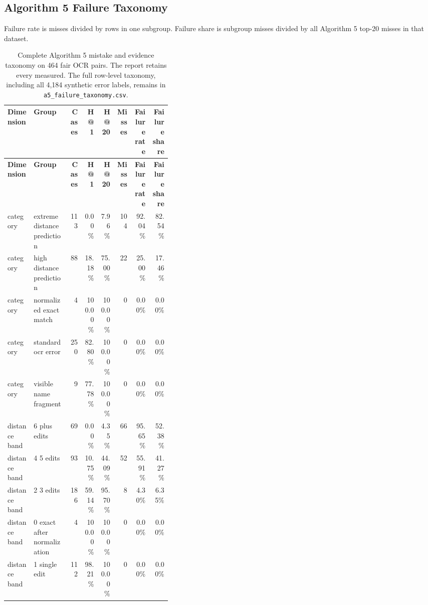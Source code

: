 \subsection{Algorithm 5 Failure Taxonomy}
Failure rate is misses divided by rows in one subgroup. Failure share is subgroup misses divided by all Algorithm 5 top-20 misses in that dataset.

\begin{landscape}
\begin{tiny}
\setlength{\tabcolsep}{0.8pt}
\renewcommand{\arraystretch}{1.05}
\begin{longtable}{@{}L{0.16\linewidth}L{0.22\linewidth}rrrrrr@{}}
\caption{Complete Algorithm 5 mistake and evidence taxonomy on 464 fair OCR pairs. The report retains every measured. The full row-level taxonomy, including all 4,184 synthetic error labels, remains in \texttt{a5\_failure\_taxonomy.csv}.}\label{tab:expanded-a5-ocr-taxonomy}\\
\toprule
\textbf{Dimension} & \textbf{Group} & \textbf{Cases} & \textbf{H@1} & \textbf{H@20} & \textbf{Misses} & \textbf{Failure rate} & \textbf{Failure share} \\
\midrule
\endfirsthead
\toprule
\textbf{Dimension} & \textbf{Group} & \textbf{Cases} & \textbf{H@1} & \textbf{H@20} & \textbf{Misses} & \textbf{Failure rate} & \textbf{Failure share} \\
\midrule
\endhead
category & extreme distance prediction & 113 & 0.00\% & 7.96\% & 104 & 92.04\% & 82.54\% \\
category & high distance prediction & 88 & 18.18\% & 75.00\% & 22 & 25.00\% & 17.46\% \\
category & normalized exact match & 4 & 100.00\% & 100.00\% & 0 & 0.00\% & 0.00\% \\
category & standard ocr error & 250 & 82.80\% & 100.00\% & 0 & 0.00\% & 0.00\% \\
category & visible name fragment & 9 & 77.78\% & 100.00\% & 0 & 0.00\% & 0.00\% \\
distance band & 6 plus edits & 69 & 0.00\% & 4.35\% & 66 & 95.65\% & 52.38\% \\
distance band & 4 5 edits & 93 & 10.75\% & 44.09\% & 52 & 55.91\% & 41.27\% \\
distance band & 2 3 edits & 186 & 59.14\% & 95.70\% & 8 & 4.30\% & 6.35\% \\
distance band & 0 exact after normalization & 4 & 100.00\% & 100.00\% & 0 & 0.00\% & 0.00\% \\
distance band & 1 single edit & 112 & 98.21\% & 100.00\% & 0 & 0.00\% & 0.00\% \\

\end{longtable}
\end{tiny}
\end{landscape}
